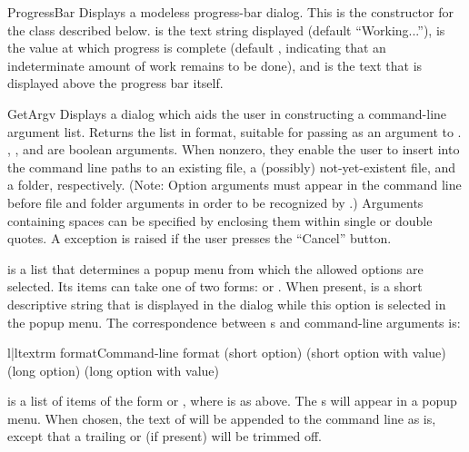 \begin{funcdesc}{ProgressBar}{}
Displays a modeless progress-bar dialog. This is the constructor for the
 class described below.  is the text
string displayed (default ``Working...''),  is the value at
which progress is complete (default , indicating that an
indeterminate amount of work remains to be done), and  is
the text that is displayed above the progress bar itself.
\end{funcdesc}


\begin{funcdesc}{GetArgv}{}
Displays a dialog which aids the user in constructing a command-line
argument list.  Returns the list in  format, suitable for
passing as an argument to .  ,
, and  are boolean arguments.  When
nonzero, they enable the user to insert into the command line paths to
an existing file, a (possibly) not-yet-existent file, and a folder,
respectively.  (Note: Option arguments must appear in the command line
before file and folder arguments in order to be recognized by
.)  Arguments containing spaces can be
specified by enclosing them within single or double quotes.  A
 exception is raised if the user presses the
``Cancel'' button.

 is a list that determines a popup menu from which the
allowed options are selected.  Its items can take one of two forms:
 or .  When present,
 is a short descriptive string that is displayed in the
dialog while this option is selected in the popup menu.  The
correspondence between s and command-line arguments is:

\begin{tableii}{l|l}{textrm}{ format}{Command-line format}
       { (short option)}
       { (short option with value)}
       { (long option)}
       { (long option with value)}
\end{tableii}

 is a list of items of the form  or
, where  is as above.  The
s will appear in a popup menu.  When chosen, the text of
 will be appended to the command line as is, except that a
trailing \character{:} or \character{=} (if present) will be trimmed
off.

\end{funcdesc}



